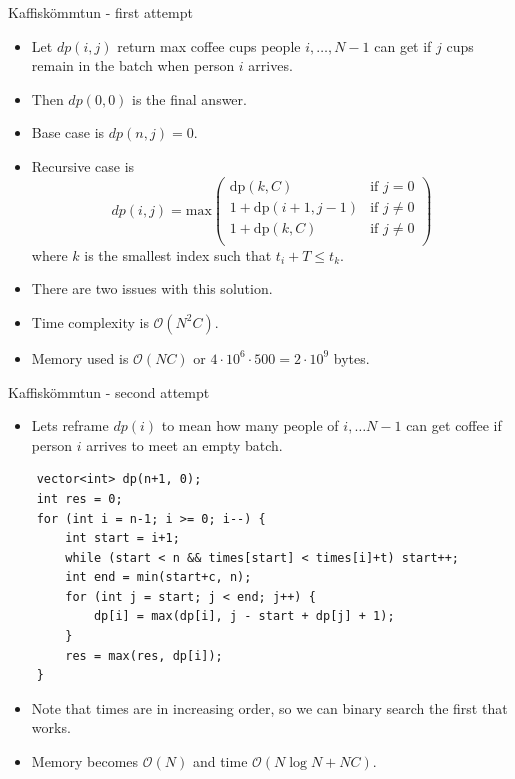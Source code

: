 \documentclass{beamer}
\begin{document}
\begin{frame}[plain]{Kaffiskömmtun - first attempt}
    \begin{itemize}
        \item<1-> Let $dp(i, j)$ return max coffee cups people $i, \dots, N-1$ can get if  $j$ cups remain in the batch when person $i$ arrives.
        \item<1-> Then $dp(0, 0)$ is the final answer.
        \item<1-> Base case is $dp(n, j) = 0$.
        \item<1-> Recursive case is \[dp(i, j) = \mathrm{max}\left(
                \begin{array}{ll}
                    \mathrm{dp}(k,C) & \textrm{if } j = 0\\
                    1 + \mathrm{dp}(i+1,j-1) & \textrm{if } j \neq 0\\
                    1 + \mathrm{dp}(k,C) & \textrm{if } j \neq 0 \\
                \end{array}\right)
              \] where $k$ is the smallest index such that $t_i + T \leq t_k$.
        \item<2-> There are two issues with this solution.
        \item<3-> Time complexity is $\mathcal{O}(N^2 C)$.
        \item<3-> Memory used is $\mathcal{O}(NC)$ or $4 \cdot 10^6 \cdot 500 = 2 \cdot 10^9$ bytes.
    \end{itemize}
\end{frame}

\begin{frame}[fragile]{Kaffiskömmtun - second attempt}
    \begin{itemize}
        \item Lets reframe $dp(i)$ to mean how many people of $i, \dots N-1$ can get coffee if person $i$ arrives to meet an empty batch.
    \end{itemize}
    \begin{verbatim}
    vector<int> dp(n+1, 0);
    int res = 0;
    for (int i = n-1; i >= 0; i--) {
        int start = i+1;
        while (start < n && times[start] < times[i]+t) start++;
        int end = min(start+c, n);
        for (int j = start; j < end; j++) {
            dp[i] = max(dp[i], j - start + dp[j] + 1);
        }
        res = max(res, dp[i]);
    }
    \end{verbatim}
    \begin{itemize}
        \item<2-> Note that times are in increasing order, so we can binary search the first that works.
        \item<2-> Memory becomes $\mathcal{O}(N)$ and time $\mathcal{O}(N \log N + NC)$.
    \end{itemize}
\end{frame}
\end{document}
